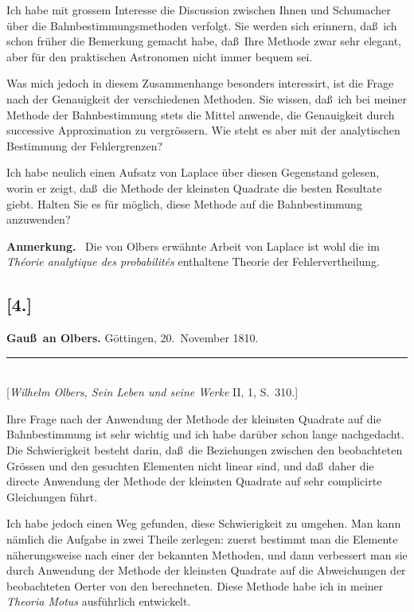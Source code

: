 \documentclass[12pt,a4paper]{article}
\theoremstyle{plain}
\theoremstyle{definition}
\theoremstyle{remark}
\begin{document}
Ich habe mit grossem Interesse die Discussion zwischen Ihnen und
{\sc Schumacher} \"uber die Bahnbestimmungsmethoden verfolgt. Sie
werden sich erinnern, da\ss\ ich schon fr\"uher die Bemerkung
gemacht habe, da\ss\ Ihre Methode zwar sehr elegant, aber f\"ur den
praktischen Astronomen nicht immer bequem sei.

Was mich jedoch in diesem Zusammenhange besonders interessirt, ist
die Frage nach der Genauigkeit der verschiedenen Methoden. Sie
wissen, da\ss\ ich bei meiner Methode der Bahnbestimmung stets die
Mittel anwende, die Genauigkeit durch successive Approximation zu
vergr\"ossern. Wie steht es aber mit der analytischen Bestimmung
der Fehlergrenzen?

Ich habe neulich einen Aufsatz von {\sc Laplace} \"uber diesen
Gegenstand gelesen, worin er zeigt, da\ss\ die Methode der kleinsten
Quadrate die besten Resultate giebt. Halten Sie es f\"ur m\"oglich,
diese Methode auf die Bahnbestimmung anzuwenden?

\medskip

\textbf{Anmerkung.} \ Die von {\sc Olbers} erw\"ahnte Arbeit von
{\sc Laplace} ist wohl die im \textit{Th\'eorie analytique des
probabilit\'es} enthaltene Theorie der Fehlervertheilung.


\subsection*{[4.]}
\begin{center}
\textbf{Gau\ss\ an Olbers.} G\"ottingen, 20.~November 1810.
\end{center}
\begin{center}
\rule{6cm}{0.4pt}\\[4pt]
[{\it Wilhelm Olbers, Sein Leben und seine Werke} II, 1, S.~310.]
\end{center}

Ihre Frage nach der Anwendung der Methode der kleinsten Quadrate
auf die Bahnbestimmung ist sehr wichtig und ich habe dar\"uber
schon lange nachgedacht. Die Schwierigkeit besteht darin, da\ss\ die
Beziehungen zwischen den beobachteten Gr\"ossen und den gesuchten
Elementen nicht linear sind, und da\ss\ daher die directe Anwendung
der Methode der kleinsten Quadrate auf sehr complicirte Gleichungen
f\"uhrt.

Ich habe jedoch einen Weg gefunden, diese Schwierigkeit zu umgehen.
Man kann n\"amlich die Aufgabe in zwei Theile zerlegen: zuerst
bestimmt man die Elemente n\"aherungsweise nach einer der bekannten
Methoden, und dann verbessert man sie durch Anwendung der Methode
der kleinsten Quadrate auf die Abweichungen der beobachteten Oerter
von den berechneten. Diese Methode habe ich in meiner
\textit{Theoria Motus} ausf\"uhrlich entwickelt.
\end{document}
